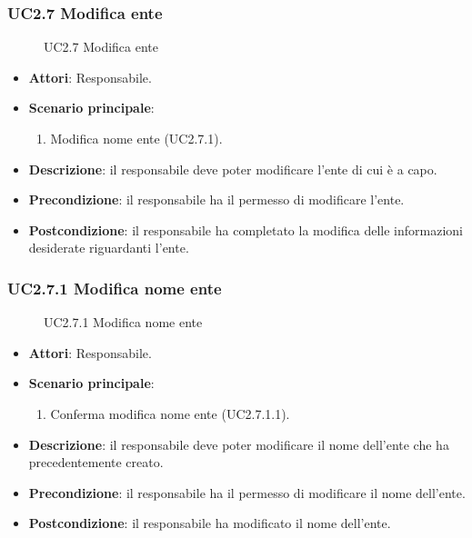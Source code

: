\subsubsection{UC2.7 Modifica ente}
\begin{figure}[H]
\centering
\noindent{}
\caption{UC2.7 Modifica ente}
\end{figure}
\begin{itemize}
\item \textbf{Attori}: Responsabile.
\item \textbf{Scenario principale}:
\begin{enumerate}
\item Modifica nome ente (UC2.7.1).
\end{enumerate}
\item \textbf{Descrizione}: il responsabile deve poter modificare l'ente di cui è a capo.
\item \textbf{Precondizione}: il responsabile ha il permesso di modificare l'ente.
\item \textbf{Postcondizione}: il responsabile ha completato la modifica delle informazioni desiderate riguardanti l'ente.
\end{itemize}
\subsubsection{UC2.7.1 Modifica nome ente}
\begin{figure}[H]
\centering
\noindent{}
\caption{UC2.7.1 Modifica nome ente}
\end{figure}
\begin{itemize}
\item \textbf{Attori}: Responsabile.
\item \textbf{Scenario principale}:
\begin{enumerate}
\item Conferma modifica nome ente (UC2.7.1.1).
\end{enumerate}
\item \textbf{Descrizione}: il responsabile deve poter modificare il nome dell'ente che ha precedentemente creato.
\item \textbf{Precondizione}: il responsabile ha il permesso di modificare il nome dell'ente.
\item \textbf{Postcondizione}: il responsabile ha modificato il nome dell'ente.
\end{itemize}
